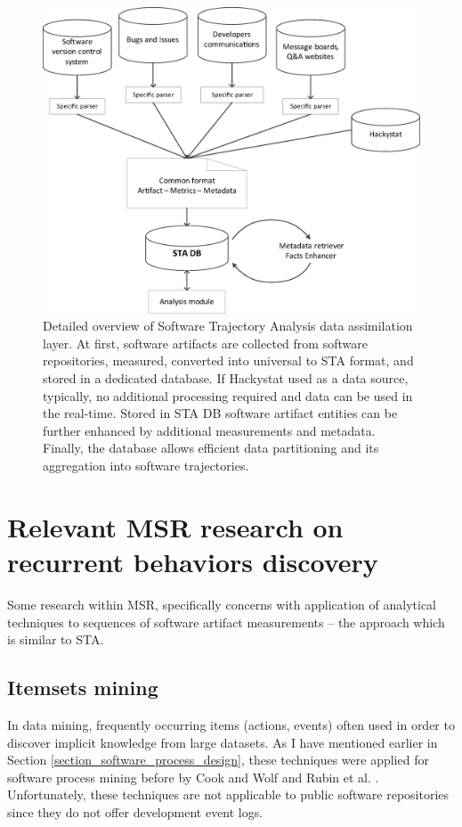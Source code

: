 \begin{figure}[t]
   \centering
   \vspace{1cm}
   \includegraphics[width=115mm]{figures/Flow.eps}
   \caption{Detailed overview of Software Trajectory Analysis data assimilation layer. 
    At first, software artifacts are collected from software repositories, measured, converted into 
    universal to STA format, and stored in a dedicated database.
    If Hackystat used as a data source, typically, no additional processing required and data can be used in the real-time.
    Stored in STA DB software artifact entities can be further enhanced by additional measurements and metadata.
    Finally, the database allows efficient data partitioning and its aggregation into software trajectories.}
   \label{fig:sta-assimilation}
\end{figure}

\section{Relevant MSR research on recurrent behaviors discovery}
Some research within MSR, specifically concerns with application of analytical techniques to sequences of software 
artifact measurements -- the approach which is similar to STA.

\subsection{Itemsets mining}
In data mining, frequently occurring items (actions, events) often used in order to discover implicit knowledge from
large datasets. As I have mentioned earlier in Section \ref{section_software_process_design}, these techniques were 
applied for software process mining before by Cook and Wolf \cite{citeulike:328044} \cite{citeulike:5120757} 
\cite{citeulike:5128143} and Rubin et al. \cite{citeulike:1885717}. Unfortunately, these techniques are not applicable
to public software repositories since they do not offer development event logs.

